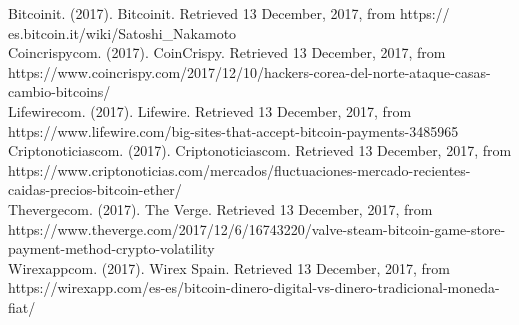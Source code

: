 \documentclass[12pt,letterpaper]{article}
\begin{document}
Bitcoinit. (2017). Bitcoinit. Retrieved 13 December, 2017, from https://
es.bitcoin.it/wiki/Satoshi\_Nakamoto
\\

Coincrispycom. (2017). CoinCrispy. Retrieved 13 December, 2017, from https://www.coincrispy.com/2017/12/10/hackers-corea-del-norte-ataque-casas-cambio-bitcoins/
\\

Lifewirecom. (2017). Lifewire. Retrieved 13 December, 2017, from https://www.lifewire.com/big-sites-that-accept-bitcoin-payments-3485965
\\

Criptonoticiascom. (2017). Criptonoticiascom. Retrieved 13 December, 2017, from https://www.criptonoticias.com/mercados/fluctuaciones-mercado-recientes-caidas-precios-bitcoin-ether/
\\

Thevergecom. (2017). The Verge. Retrieved 13 December, 2017, from https://www.theverge.com/2017/12/6/16743220/valve-steam-bitcoin-game-store-payment-method-crypto-volatility
\\

Wirexappcom. (2017). Wirex Spain. Retrieved 13 December, 2017, from https://wirexapp.com/es-es/bitcoin-dinero-digital-vs-dinero-tradicional-moneda-fiat/
\end{document}
